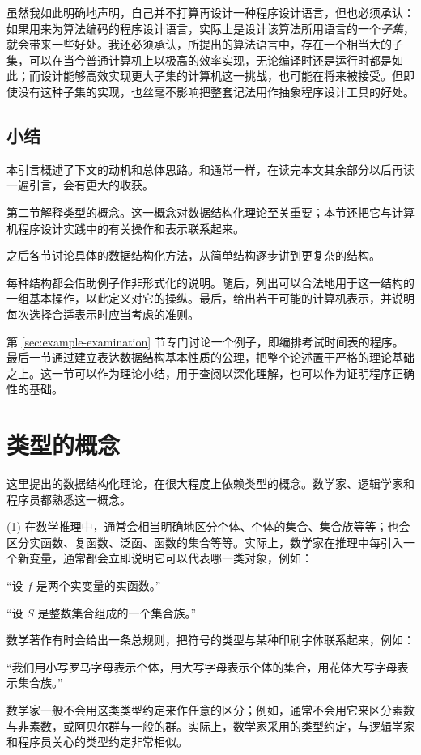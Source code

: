 \documentclass[twoside,11pt,fontset=none]{ctexbook}
\begin{document}
虽然我如此明确地声明，自己并不打算再设计一种程序设计语言，但也必须承认：如果用来为算法编码的程序设计语言，实际上是设计该算法所用语言的一个\textit{子集}，就会带来一些好处。我还必须承认，所提出的算法语言中，存在一个相当大的子集，可以在当今普通计算机上以极高的效率实现，无论编译时还是运行时都是如此；而设计能够高效实现更大子集的计算机这一挑战，也可能在将来被接受。但即使没有这种子集的实现，也丝毫不影响把整套记法用作抽象程序设计工具的好处。

\subsection{小结}

本引言概述了下文的动机和总体思路。和通常一样，在读完本文其余部分以后再读一遍引言，会有更大的收获。

第二节解释类型的概念。这一概念对数据结构化理论至关重要；本节还把它与计算机程序设计实践中的有关操作和表示联系起来。

之后各节讨论具体的数据结构化方法，从简单结构逐步讲到更复杂的结构。

每种结构都会借助例子作非形式化的说明。随后，列出可以合法地用于这一结构的一组基本操作，以此定义对它的操纵。最后，给出若干可能的计算机表示，并说明每次选择合适表示时应当考虑的准则。

第 \ref{sec:example-examination} 节专门讨论一个例子，即编排考试时间表的程序。最后一节通过建立表达数据结构基本性质的公理，把整个论述置于严格的理论基础之上。这一节可以作为理论小结，用于查阅以深化理解，也可以作为证明程序正确性的基础。
\section[类型的概念]{类型的概念}

这里提出的数据结构化理论，在很大程度上依赖类型的概念。数学家、逻辑学家和程序员都熟悉这一概念。

(1) 在数学推理中，通常会相当明确地区分个体、个体的集合、集合族等等；也会区分实函数、复函数、泛函、函数的集合等等。实际上，数学家在推理中每引入一个新变量，通常都会立即说明它可以代表哪一类对象，例如：

\quad “设 $f$ 是两个实变量的实函数。”

\quad “设 $S$ 是整数集合组成的一个集合族。”

数学著作有时会给出一条总规则，把符号的类型与某种印刷字体联系起来，例如：

\parindent \quad“我们用小写罗马字母表示个体，用大写字母表示个体的集合，用花体大写字母表示集合族。”

数学家一般不会用这类类型约定来作任意的区分；例如，通常不会用它来区分素数与非素数，或阿贝尔群与一般的群。实际上，数学家采用的类型约定，与逻辑学家和程序员关心的类型约定非常相似。
\end{document}
